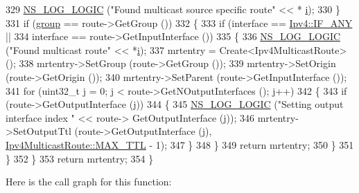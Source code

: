 \begin{DoxyCode}
329           \hyperlink{group__logging_ga88acd260151caf2db9c0fc84997f45ce}{NS\_LOG\_LOGIC} (\textcolor{stringliteral}{"Found multicast source specific route"} << *
      \hyperlink{bernuolliDistribution_8m_a6f6ccfcf58b31cb6412107d9d5281426}{i});
330         \}
331       \textcolor{keywordflow}{if} (\hyperlink{namespacevisualizer_1_1higcontainer_aa6ad2b76790275bfce7783429beaa23f}{group} == route->GetGroup ())
332         \{
333           \textcolor{keywordflow}{if} (interface == \hyperlink{classns3_1_1Ipv4_a9b05b2610976f8d53da45d95891a0657}{Ipv4::IF\_ANY} || 
334               interface == route->GetInputInterface ())
335             \{
336               \hyperlink{group__logging_ga88acd260151caf2db9c0fc84997f45ce}{NS\_LOG\_LOGIC} (\textcolor{stringliteral}{"Found multicast route"} << *\hyperlink{bernuolliDistribution_8m_a6f6ccfcf58b31cb6412107d9d5281426}{i});
337               mrtentry = Create<Ipv4MulticastRoute> ();
338               mrtentry->SetGroup (route->GetGroup ());
339               mrtentry->SetOrigin (route->GetOrigin ());
340               mrtentry->SetParent (route->GetInputInterface ());
341               \textcolor{keywordflow}{for} (uint32\_t j = 0; j < route->GetNOutputInterfaces (); j++)
342                 \{
343                   \textcolor{keywordflow}{if} (route->GetOutputInterface (j))
344                     \{
345                       \hyperlink{group__logging_ga88acd260151caf2db9c0fc84997f45ce}{NS\_LOG\_LOGIC} (\textcolor{stringliteral}{"Setting output interface index "} << route->
      GetOutputInterface (j));
346                       mrtentry->SetOutputTtl (route->GetOutputInterface (j), 
      \hyperlink{classns3_1_1Ipv4MulticastRoute_ab7118310b9ac11a437788db9c1250412}{Ipv4MulticastRoute::MAX\_TTL} - 1);
347                     \}
348                 \}
349               \textcolor{keywordflow}{return} mrtentry;
350             \}
351         \}
352     \}
353   \textcolor{keywordflow}{return} mrtentry;
354 \}
\end{DoxyCode}


Here is the call graph for this function\+:


